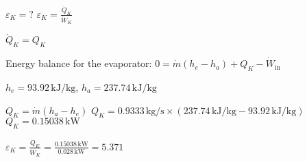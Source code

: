 \( \varepsilon_K = ? \)  
\( \varepsilon_K = \frac{\dot{Q}_K}{\dot{W}_K} \)  

\( \dot{Q}_K = Q_K \)  

Energy balance for the evaporator:  
\( 0 = \dot{m} (h_e - h_a) + Q_K - \dot{W}_{\text{in}} \)  

\( h_e = 93.92 \, \text{kJ/kg} \), \( h_a = 237.74 \, \text{kJ/kg} \)  

\( Q_K = \dot{m} (h_a - h_e) \)  
\( Q_K = 0.9333 \, \text{kg/s} \times (237.74 \, \text{kJ/kg} - 93.92 \, \text{kJ/kg}) \)  
\( Q_K = 0.15038 \, \text{kW} \)  

\( \varepsilon_K = \frac{\dot{Q}_K}{\dot{W}_K} = \frac{0.15038 \, \text{kW}}{0.028 \, \text{kW}} = 5.371 \)